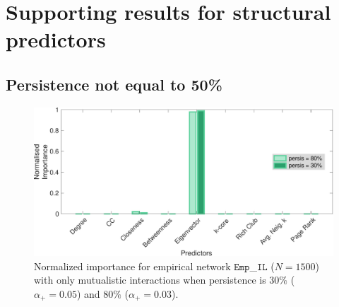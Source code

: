\chapter{Supporting results for structural predictors}\label{appen:SuppPredictors}


\section{Persistence not equal to 50\%} \label{SI:1}
\begin{figure}[h]
    \centering
    \includegraphics[width=\textwidth]{figures/appendices/fig_Importance_mut_persisNOT50.pdf}
    \caption[Importance profile when persistence is not $50\%$]{Normalized importance for empirical network $\texttt{Emp}$\_$\texttt{IL}$ ($N = 1500$) with only mutualistic interactions when persistence is $30\%$ ($\alpha_+ = 0.05$) and $80\%$ ($\alpha_+ = 0.03$).}
\end{figure}

\newpage
